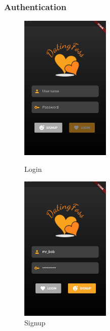 \documentclass{article}
\begin{document}
\subsubsection{Authentication}
\begin{figure}[!htb]
	\centering
	\begin{minipage}{.45\textwidth}
		\centering
		\includegraphics[height=7cm,keepaspectratio]{assets/images/ui/signup/00-login.png}
		\caption{Login}
	\end{minipage}\quad
	\begin{minipage}{.45\textwidth}
		\centering
		\includegraphics[height=7cm,keepaspectratio]{assets/images/ui/signup/02-signup-filled.png}
		\caption{Signup}
	\end{minipage}
\end{figure}
\end{document}
